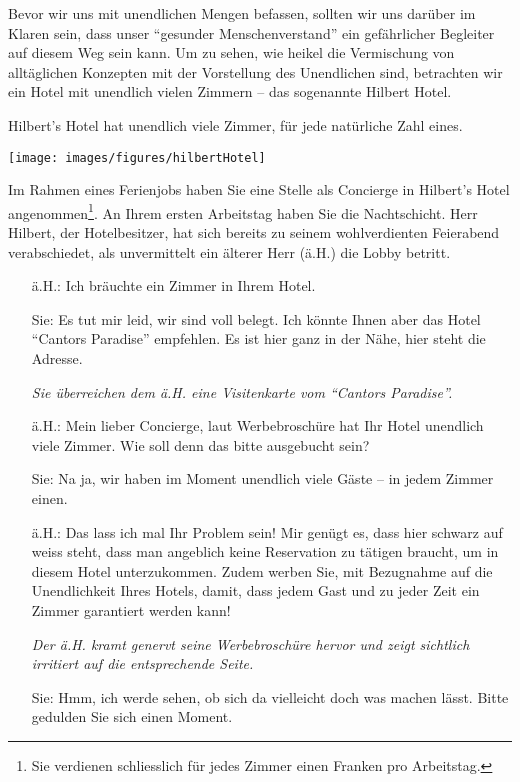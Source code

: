 Bevor wir uns mit unendlichen Mengen befassen, sollten wir uns darüber im Klaren sein, dass unser ``gesunder Menschenverstand'' ein gefährlicher Begleiter auf diesem Weg sein kann. Um zu sehen, wie heikel die Vermischung von alltäglichen Konzepten mit der Vorstellung des Unendlichen sind, betrachten wir ein Hotel mit unendlich vielen Zimmern -- das sogenannte Hilbert Hotel.
\begin{example}
Hilbert's Hotel hat unendlich viele Zimmer, für jede natürliche Zahl eines.
\begin{center}
\begin{framed}
\texttt{[image: images/figures/hilbertHotel]}
\end{framed}
\end{center}
Im Rahmen eines Ferienjobs haben Sie eine Stelle als Concierge in Hilbert's Hotel angenommen\footnote{Sie verdienen schliesslich für jedes Zimmer einen Franken pro Arbeitstag.}. An Ihrem ersten Arbeitstag haben Sie die Nachtschicht. Herr Hilbert, der Hotelbesitzer, hat sich bereits zu seinem wohlverdienten Feierabend verabschiedet, als unvermittelt ein älterer Herr (ä.H.) die Lobby betritt.
\begin{itemize}
\item[ä.H.:] Ich bräuchte ein Zimmer in Ihrem Hotel.
\item[Sie:] Es tut mir leid, wir sind voll belegt. Ich könnte Ihnen aber das Hotel ``Cantors Paradise'' empfehlen. Es ist hier ganz in der Nähe, hier steht die Adresse.

\textit{Sie überreichen dem ä.H. eine Visitenkarte vom ``Cantors Paradise''.}
\item[ä.H.:] Mein lieber Concierge, laut Werbebroschüre hat Ihr Hotel unendlich viele Zimmer. Wie soll denn das bitte ausgebucht sein?
\item[Sie:] Na ja, wir haben im Moment unendlich viele Gäste -- in jedem Zimmer einen.
\item[ä.H.:] Das lass ich mal Ihr Problem sein! Mir genügt es, dass hier schwarz auf weiss steht, dass man angeblich keine Reservation zu tätigen braucht, um in diesem Hotel unterzukommen. Zudem werben Sie, mit Bezugnahme auf die Unendlichkeit Ihres Hotels, damit, dass jedem Gast und zu jeder Zeit ein Zimmer garantiert werden kann!

\textit{Der ä.H. kramt genervt seine Werbebroschüre hervor und zeigt sichtlich irritiert auf die entsprechende Seite.}
\item[Sie:] Hmm, ich werde sehen, ob sich da vielleicht doch was machen lässt. Bitte gedulden Sie sich einen Moment.


\end{itemize}
\end{example}
